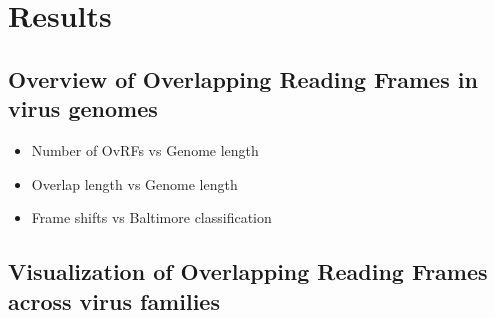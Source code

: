 \documentclass[12pt]{article}
\begin{document}
\section{Results}
\subsection{Overview of Overlapping Reading Frames in virus genomes}
\begin{itemize}
    \item Number of OvRFs vs Genome length
    \item Overlap length vs Genome length
    \item Frame shifts vs Baltimore classification
\end{itemize}

\subsection{Visualization of Overlapping Reading Frames across virus families}
\newpage


\end{document}
